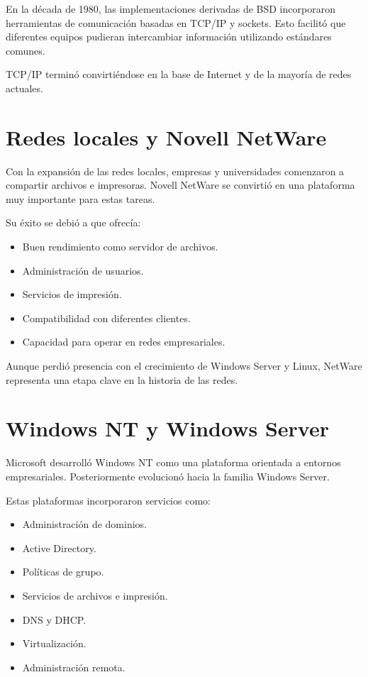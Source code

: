 \documentclass[
  spanish,
  letterpaper,
]{scrbook}
\providecommand{\tightlist}{%
  \setlength{\itemsep}{0pt}\setlength{\parskip}{0pt}}
\begin{document}
En la década de 1980, las implementaciones derivadas de BSD incorporaron
herramientas de comunicación basadas en TCP/IP y sockets. Esto facilitó
que diferentes equipos pudieran intercambiar información utilizando
estándares comunes.

TCP/IP terminó convirtiéndose en la base de Internet y de la mayoría de
redes actuales.

\section{Redes locales y Novell
NetWare}\label{redes-locales-y-novell-netware}

Con la expansión de las redes locales, empresas y universidades
comenzaron a compartir archivos e impresoras. Novell NetWare se
convirtió en una plataforma muy importante para estas tareas.

Su éxito se debió a que ofrecía:

\begin{itemize}
\tightlist
\item
  Buen rendimiento como servidor de archivos.
\item
  Administración de usuarios.
\item
  Servicios de impresión.
\item
  Compatibilidad con diferentes clientes.
\item
  Capacidad para operar en redes empresariales.
\end{itemize}

Aunque perdió presencia con el crecimiento de Windows Server y Linux,
NetWare representa una etapa clave en la historia de las redes.

\section{Windows NT y Windows Server}\label{windows-nt-y-windows-server}

Microsoft desarrolló Windows NT como una plataforma orientada a entornos
empresariales. Posteriormente evolucionó hacia la familia Windows
Server.

Estas plataformas incorporaron servicios como:

\begin{itemize}
\tightlist
\item
  Administración de dominios.
\item
  Active Directory.
\item
  Políticas de grupo.
\item
  Servicios de archivos e impresión.
\item
  DNS y DHCP.
\item
  Virtualización.
\item
  Administración remota.
\end{itemize}
\end{document}
